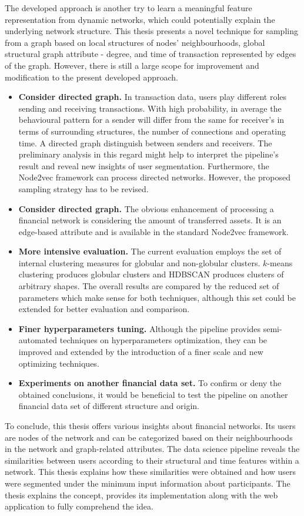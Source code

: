 The developed approach is another try to learn a meaningful feature representation from dynamic networks, which could potentially explain the underlying network structure. This thesis presents a novel technique for sampling from a graph based on local structures of nodes' neighbourhoods, global structural graph attribute - degree, and time of transaction represented by edges of the graph. However, there is still a large scope for improvement and modification to the present developed approach.
\begin{itemize}
    \item \textbf{Consider directed graph. }In transaction data, users play different roles sending and receiving transactions. With high probability, in average the behavioural pattern for a sender will differ from the same for receiver's in terms of surrounding structures, the number of connections and operating time. A directed graph distinguish between senders and receivers. The preliminary analysis in this regard might help to interpret the pipeline's result and reveal new insights of user segmentation. Furthermore, the Node2vec framework can process directed networks. However, the proposed sampling strategy has to be revised.
    \item \textbf{Consider directed graph. }The obvious enhancement of processing a financial network is considering the amount of transferred assets. It is an edge-based attribute and is available in the standard Node2vec framework.
    \item \textbf{More intensive evaluation. }The current evaluation employs the set of internal clustering measures for globular and non-globular clusters. $k$-means clustering produces globular clusters and HDBSCAN produces clusters of arbitrary shapes. The overall results are compared by the reduced set of parameters which make sense for both techniques, although this set could be extended for better evaluation and comparison.
    \item \textbf{Finer hyperparameters tuning. }Although the pipeline provides semi-automated techniques on hyperparameters optimization, they can be improved and extended by the introduction of a finer scale and new optimizing techniques.
    \item \textbf{Experiments on another financial data set. }To confirm or deny the obtained conclusions, it would be beneficial to test the pipeline on another financial data set of different structure and origin.
\end{itemize}
To conclude, this thesis offers various insights about financial networks. Its users are nodes of the network and can be categorized based on their neighbourhoods in the network and graph-related attributes. The data science pipeline reveals the similarities between users according to their structural and time features within a network. This thesis explains how these similarities were obtained and how users were segmented under the minimum input information about participants. The thesis explains the concept, provides its implementation along with the web application to fully comprehend the idea.

